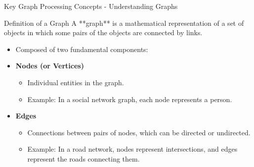 \documentclass[aspectratio=169]{beamer}
\begin{document}
\begin{frame}[fragile]{Key Graph Processing Concepts - Understanding Graphs}
    \begin{block}{Definition of a Graph}
        A **graph** is a mathematical representation of a set of objects in which some pairs of the objects are connected by links. 
    \end{block}
    
    \begin{itemize}
        \item Composed of two fundamental components:
        \item \textbf{Nodes (or Vertices)}
            \begin{itemize}
                \item Individual entities in the graph.
                \item Example: In a social network graph, each node represents a person.
            \end{itemize}
        \item \textbf{Edges}
            \begin{itemize}
                \item Connections between pairs of nodes, which can be directed or undirected.
                \item Example: In a road network, nodes represent intersections, and edges represent the roads connecting them.
            \end{itemize}
    \end{itemize}
\end{frame}
\end{document}
